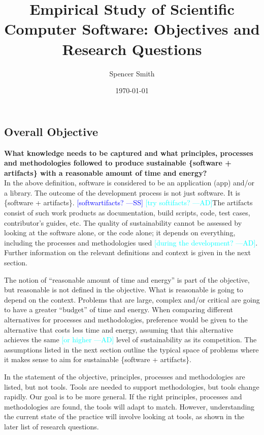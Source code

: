 \documentclass[12pt]{article}
\newcommand{\authornote}[3]{\textcolor{#1}{[#3 ---#2]}}
\newcommand{\authornote}[3]{}
\newcommand{\wss}[1]{\authornote{blue}{SS}{#1}} %
\newcommand{\ad}[1]{\authornote{cyan}{AD}{#1}} %
\begin{document}
\title{Empirical Study of Scientific Computer Software: Objectives and Research Questions} 
\author{Spencer Smith}
\date{\today}
	

\subsection* {Overall Objective}

\textbf{What knowledge needs to be captured and what principles, processes and
  methodologies followed to produce sustainable \{software + artifacts\} with
  a reasonable amount of time and energy?}\\

In the above definition, software is considered to be an application (app)
and/or a library.  The outcome of the development process is not just software.
It is \{software + artifacts\}.  \wss{softwartifacts?} \ad{try softifacts?}The artifacts consist of
such work products as documentation, build scripts, code, test cases,
contributor's guides, etc.  The quality of sustainability cannot be assessed by
looking at the software alone, or the code alone; it depends on everything,
including the processes and methodologies used \ad{during the development?}.  Further information on the
relevant definitions and context is given in the next section.

The notion of ``reasonable amount of time and energy'' is part of the objective,
but reasonable is not defined in the objective.  What is reasonable is going to
depend on the context.  Problems that are large, complex and/or critical are
going to have a greater ``budget'' of time and energy.  When comparing different
alternatives for processes and methodologies, preference would be given to the
alternative that costs less time and energy, assuming that this alternative
achieves the same \ad{or higher} level of sustainability as its competition.  The assumptions
listed in the next section outline the typical space of problems where it makes
sense to aim for sustainable \{software + artifacts\}.

In the statement of the objective, principles, processes and methodologies are
listed, but not tools.  Tools are needed to support methodologies, but tools
change rapidly.  Our goal is to be more general.  If the right principles,
processes and methodologies are found, the tools will adapt to match.  However,
understanding the current state of the practice will involve looking at tools,
as shown in the later list of research questions.
\end{document}

